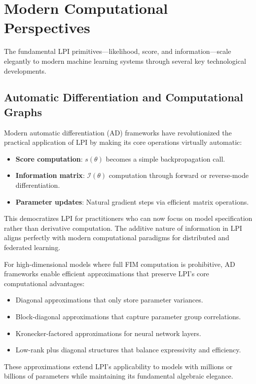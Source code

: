\documentclass[11pt]{article}
\begin{document}
\section{Modern Computational Perspectives}
The fundamental LPI primitives---likelihood, score, and information---scale elegantly to modern machine learning systems through several key technological developments.

\subsection{Automatic Differentiation and Computational Graphs}
Modern automatic differentiation (AD) frameworks \cite{baydin2018automatic} have revolutionized the practical application of LPI by making its core operations virtually automatic:

\begin{itemize}
\item \textbf{Score computation}: $s(\theta)$ becomes a simple backpropagation call.
\item \textbf{Information matrix}: $\mathcal{I}(\theta)$ computation through forward or reverse-mode differentiation.
\item \textbf{Parameter updates}: Natural gradient steps via efficient matrix operations.
\end{itemize}

This democratizes LPI for practitioners who can now focus on model specification rather than derivative computation. The additive nature of information in LPI aligns perfectly with modern computational paradigms for distributed and federated learning.

For high-dimensional models where full FIM computation is prohibitive, AD frameworks enable efficient approximations that preserve LPI's core computational advantages:

\begin{itemize}
\item Diagonal approximations that only store parameter variances.
\item Block-diagonal approximations that capture parameter group correlations.
\item Kronecker-factored approximations for neural network layers.
\item Low-rank plus diagonal structures that balance expressivity and efficiency.
\end{itemize}

These approximations extend LPI's applicability to models with millions or billions of parameters while maintaining its fundamental algebraic elegance.
\end{document}
